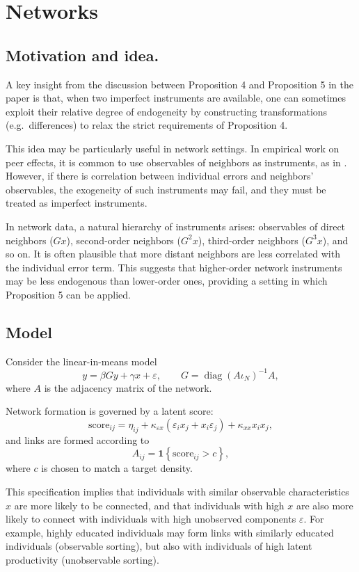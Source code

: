 \documentclass[12pt]{article}
\begin{document}
\section{Networks}

\subsection{Motivation and idea.}
A key insight from the discussion between Proposition 4 and Proposition 5 in the paper is that, when two imperfect instruments are available, one can sometimes exploit their relative degree of endogeneity by constructing transformations (e.g.\ differences) to relax the strict requirements of Proposition 4. 

This idea may be particularly useful in network settings. In empirical work on peer effects, it is common to use observables of neighbors as instruments, as in \textcite{bramoulle2009identification}. However, if there is correlation between individual errors and neighbors' observables, the exogeneity of such instruments may fail, and they must be treated as imperfect instruments.

In network data, a natural hierarchy of instruments arises: observables of direct neighbors ($Gx$), second-order neighbors ($G^2 x$), third-order neighbors ($G^3 x$), and so on. It is often plausible that more distant neighbors are less correlated with the individual error term. This suggests that higher-order network instruments may be less endogenous than lower-order ones, providing a setting in which Proposition 5 can be applied.

\subsection{Model}
Consider the linear-in-means model
\[
y = \beta G y + \gamma x + \varepsilon,
\qquad
G = \operatorname{diag}(A \iota_N)^{-1} A,
\]
where $A$ is the adjacency matrix of the network.

Network formation is governed by a latent score:
\[
\text{score}_{ij}
=
\eta_{ij}
+
\kappa_{\varepsilon x} (\varepsilon_i x_j + x_i \varepsilon_j)
+
\kappa_{xx} x_i x_j,
\]
and links are formed according to
\[
A_{ij}
=
\mathbf{1}
\left\{
\text{score}_{ij} > c
\right\},
\]
where $c$ is chosen to match a target density.

This specification implies that individuals with similar observable characteristics $x$ are more likely to be connected, and that individuals with high $x$ are also more likely to connect with individuals with high unobserved components $\varepsilon$. For example, highly educated individuals may form links with similarly educated individuals (observable sorting), but also with individuals of high latent productivity (unobservable sorting).
\end{document}
